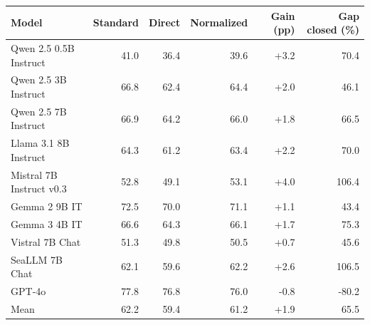 \begin{tabular}{lrrrrr}
\toprule
Model & Standard & Direct & Normalized & Gain (pp) & Gap closed (\%) \\
\midrule
Qwen 2.5 0.5B Instruct & 41.0 & 36.4 & 39.6 & +3.2 & 70.4 \\
Qwen 2.5 3B Instruct & 66.8 & 62.4 & 64.4 & +2.0 & 46.1 \\
Qwen 2.5 7B Instruct & 66.9 & 64.2 & 66.0 & +1.8 & 66.5 \\
Llama 3.1 8B Instruct & 64.3 & 61.2 & 63.4 & +2.2 & 70.0 \\
Mistral 7B Instruct v0.3 & 52.8 & 49.1 & 53.1 & +4.0 & 106.4 \\
Gemma 2 9B IT & 72.5 & 70.0 & 71.1 & +1.1 & 43.4 \\
Gemma 3 4B IT & 66.6 & 64.3 & 66.1 & +1.7 & 75.3 \\
Vistral 7B Chat & 51.3 & 49.8 & 50.5 & +0.7 & 45.6 \\
SeaLLM 7B Chat & 62.1 & 59.6 & 62.2 & +2.6 & 106.5 \\
GPT-4o & 77.8 & 76.8 & 76.0 & -0.8 & -80.2 \\
\midrule
Mean & 62.2 & 59.4 & 61.2 & +1.9 & 65.5 \\
\bottomrule
\end{tabular}
